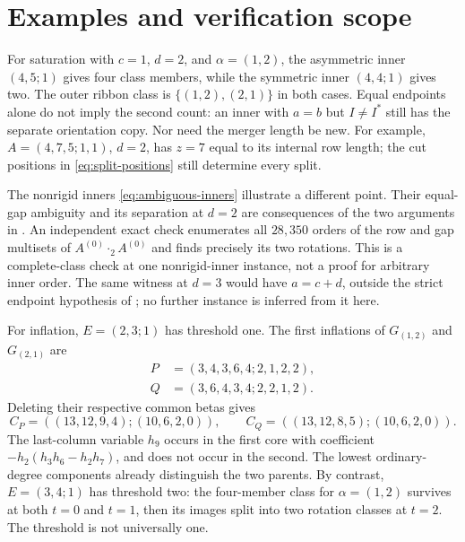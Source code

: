 \documentclass[11pt,a4paper]{amsart}
\numberwithin{equation}{section}
\theoremstyle{plain}
\theoremstyle{definition}
\begin{document}
\section{Examples and verification scope}\label{sec:examples}

For saturation with \(c=1\), \(d=2\), and \(\alpha=(1,2)\),
the asymmetric inner \((4,5;1)\) gives four class members, while the
symmetric inner \((4,4;1)\) gives two.  The outer ribbon class is
\(\{(1,2),(2,1)\}\) in both cases.  Equal endpoints alone do not
imply the second count: an inner with \(a=b\) but \(I\ne I^*\)
still has the separate orientation copy.  Nor need the merger length
be new.  For example, \(A=(4,7,5;1,1)\), \(d=2\), has
\(z=7\) equal to its internal row length; the cut positions in
\eqref{eq:split-positions} still determine every split.

The nonrigid inners \eqref{eq:ambiguous-inners} illustrate a different
point.  Their equal-gap ambiguity and its separation at \(d=2\)
are consequences of the two arguments in
.  An independent exact check enumerates
all \(28{,}350\) orders of the row and gap multisets of
\(A^{(0)}\cdot_2 A^{(0)}\) and finds precisely its two rotations.
This is a complete-class check at one nonrigid-inner instance, not a
proof for arbitrary inner order.  The same witness at \(d=3\)
would have \(a=c+d\), outside the strict endpoint hypothesis of
; no further instance is inferred
from it here.

For inflation, \(E=(2,3;1)\) has threshold one.  The first inflations
of \(G_{(1,2)}\) and \(G_{(2,1)}\) are
\begin{equation}\label{eq:first-boundary-example}
 \begin{aligned}
 P&=(3,4,3,6,4;2,1,2,2),\\
 Q&=(3,6,4,3,4;2,2,1,2).
 \end{aligned}
\end{equation}
Deleting their respective common betas gives
\[
 C_P=((13,12,9,4);(10,6,2,0)),\qquad
 C_Q=((13,12,8,5);(10,6,2,0)).
\]
The last-column variable \(h_9\) occurs in the first core with
coefficient \(-h_2(h_3h_6-h_2h_7)\), and does not occur in the
second.  The lowest ordinary-degree components already distinguish the
two parents.  By contrast, \(E=(3,4;1)\) has threshold two:
the four-member class for \(\alpha=(1,2)\) survives at both
\(t=0\) and \(t=1\), then its images split into two rotation
classes at \(t=2\).  The threshold is not universally one.
\end{document}
